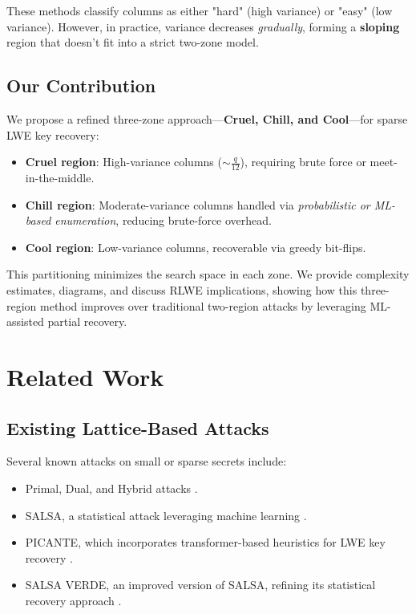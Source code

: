\documentclass[conference]{IEEEtran}
\begin{document}
    These methods classify columns as either "hard" (high variance) or "easy" (low variance). However, in practice, variance decreases \emph{gradually}, forming a \textbf{sloping} region that doesn't fit into a strict two-zone model.
    
    \subsection{Our Contribution}
    
    We propose a refined three-zone approach—\textbf{Cruel, Chill, and Cool}—for sparse LWE key recovery:
    
    \begin{itemize}
        \item \textbf{Cruel region}: High-variance columns (\(\sim \frac{q}{12}\)), requiring brute force or meet-in-the-middle.
        \item \textbf{Chill region}: Moderate-variance columns handled via \emph{probabilistic or ML-based enumeration}, reducing brute-force overhead.
        \item \textbf{Cool region}: Low-variance columns, recoverable via greedy bit-flips.
    \end{itemize}
    
    This partitioning minimizes the search space in each zone. We provide complexity estimates, diagrams, and discuss RLWE implications, showing how this three-region method improves over traditional two-region attacks by leveraging ML-assisted partial recovery.    
  
  \section{Related Work}
  
  \subsection{Existing Lattice-Based Attacks}
  Several known attacks on small or sparse secrets include:
  \begin{itemize}
      \item Primal, Dual, and Hybrid attacks \cite{primal-dual, hybrid-mitm}.
      \item SALSA, a statistical attack leveraging machine learning \cite{salsa}.
      \item PICANTE, which incorporates transformer-based heuristics for LWE key recovery \cite{picante}.
      \item SALSA VERDE, an improved version of SALSA, refining its statistical recovery approach \cite{salsa-verde}.
  \end{itemize}
  
\end{document}
